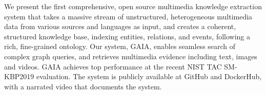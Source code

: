 We present the first comprehensive, open source multimedia knowledge extraction system that takes a massive stream of unstructured, heterogeneous multimedia data from various sources and languages as input, and creates a coherent, structured knowledge base, indexing entities, relations, and events, following a rich, fine-grained ontology. Our system, GAIA, enables seamless search of complex graph queries, and retrieves multimedia evidence including text, images and videos. GAIA achieves top performance at the recent NIST TAC SM-KBP2019 evaluation. The system is publicly available at GitHub and DockerHub, with a narrated video that documents the system.
